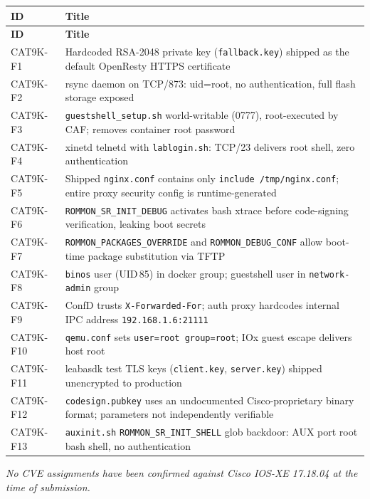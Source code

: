 \documentclass[11pt,a4paper]{article}
\begin{document}
\begin{longtable}{@{}lL{13cm}@{}}
  \toprule
  \textbf{ID} & \textbf{Title} \\
  \midrule \endfirsthead
  \toprule
  \textbf{ID} & \textbf{Title} \\
  \midrule \endhead
  \bottomrule \endlastfoot
  CAT9K-F1  & Hardcoded RSA-2048 private key (\texttt{fallback.key}) shipped as the default OpenResty HTTPS certificate \\[2pt]
  CAT9K-F2  & rsync daemon on TCP/873: uid=root, no authentication, full flash storage exposed \\[2pt]
  CAT9K-F3  & \texttt{guestshell\_setup.sh} world-writable (0777), root-executed by CAF; removes container root password \\[2pt]
  CAT9K-F4  & xinetd telnetd with \texttt{lablogin.sh}: TCP/23 delivers root shell, zero authentication \\[2pt]
  CAT9K-F5  & Shipped \texttt{nginx.conf} contains only \texttt{include /tmp/nginx.conf}; entire proxy security config is runtime-generated \\[2pt]
  CAT9K-F6  & \texttt{ROMMON\_SR\_INIT\_DEBUG} activates bash xtrace before code-signing verification, leaking boot secrets \\[2pt]
  CAT9K-F7  & \texttt{ROMMON\_PACKAGES\_OVERRIDE} and \texttt{ROMMON\_DEBUG\_CONF} allow boot-time package substitution via TFTP \\[2pt]
  CAT9K-F8  & \texttt{binos} user (UID\,85) in docker group; guestshell user in \texttt{network-admin} group \\[2pt]
  CAT9K-F9  & ConfD trusts \texttt{X-Forwarded-For}; auth proxy hardcodes internal IPC address \texttt{192.168.1.6:21111} \\[2pt]
  CAT9K-F10 & \texttt{qemu.conf} sets \texttt{user=root group=root}; IOx guest escape delivers host root \\[2pt]
  CAT9K-F11 & leabasdk test TLS keys (\texttt{client.key}, \texttt{server.key}) shipped unencrypted to production \\[2pt]
  CAT9K-F12 & \texttt{codesign.pubkey} uses an undocumented Cisco-proprietary binary format; parameters not independently verifiable \\[2pt]
  CAT9K-F13 & \texttt{auxinit.sh} \texttt{ROMMON\_SR\_INIT\_SHELL} glob backdoor: AUX port root bash shell, no authentication \\
\end{longtable}

\textit{No CVE assignments have been confirmed against Cisco IOS-XE 17.18.04 at the
time of submission.}
\end{document}
